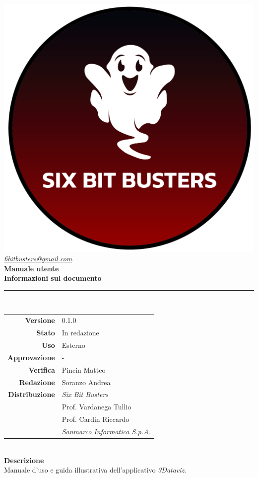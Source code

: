 \thispagestyle{empty}
\renewcommand{\arraystretch}{1.3}


\begin{titlepage}
	\begin{center}
		
	\includegraphics[scale = 0.6]{template/images/logo-circle.png}
	\\[0.8cm]
	\href{mailto:6bitbusters@gmail.com}		      	
	{\large{\textit{6bitbusters@gmail.com} } }\\[0.8cm]
	
	\Huge \textbf{Manuale utente} \\[0.5cm]

	\large \textbf{Informazioni sul documento} \\
	\rule{0.6\textwidth}{0.4pt}
	\\[0.5cm]
	\begin{tabular}{r|l}
		\textbf{Versione} & 0.1.0\\
		\textbf{Stato} & In redazione\\
		\textbf{Uso} & Esterno\\                         
		\textbf{Approvazione} & -\\                      
		\textbf{Verifica} & Pincin Matteo\\                        
		\textbf{Redazione} & Soranzo Andrea\\
		\textbf{Distribuzione} & \textit{Six Bit Busters} \\ & Prof. Vardanega Tullio \\ & Prof. Cardin Riccardo \\ & \textit{Sanmarco Informatica S.p.A.}
	\end{tabular}	
	\\[0.8cm]

	\large \textbf{Descrizione} \\
	Manuale d'uso e guida illustrativa dell'applicativo \textit{3Dataviz}.
	
	\end{center}
\end{titlepage}
